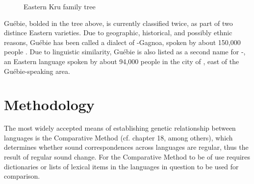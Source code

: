 \documentclass[output=paper,modfonts]{langscibook}
\begin{document}

\begin{figure}
\caption{Eastern Kru family tree}
\label{familytree}
\end{figure}

Guébie, bolded in the tree above, is currently classified twice, as part of two distince Eastern  varieties. Due to geographic, historical, and possibly ethnic reasons, Guébie has been called a dialect of -Gagnoa, spoken by about 150,000 people \citep{LewisEtAl2013}. Due to linguistic similarity, Guébie is also listed as a second name for -, an Eastern  language spoken by about 94,000 people in the city of , east of the Guébie-speaking area.


\section{Methodology}\label{sec:sande:methods}

The most widely accepted means of establishing genetic relationship between languages is the Comparative Method (cf. \citealt{Bloomfield1933} chapter 18, among others), which determines whether sound correspondences across languages are regular, thus the result of regular sound change. For the Comparative Method to be of use requires dictionaries or lists of lexical items in the languages in question to be used for comparison. 
\end{document}
